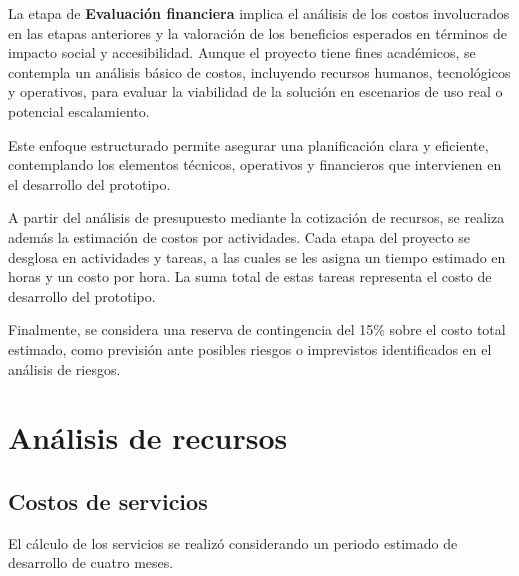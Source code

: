 La etapa de \textbf{Evaluación financiera} implica el análisis de los costos involucrados en las etapas anteriores y la valoración de los beneficios esperados en términos de impacto social y accesibilidad. Aunque el proyecto tiene fines académicos, se contempla un análisis básico de costos, incluyendo recursos humanos, tecnológicos y operativos, para evaluar la viabilidad de la solución en escenarios de uso real o potencial escalamiento.

Este enfoque estructurado permite asegurar una planificación clara y eficiente, contemplando los elementos técnicos, operativos y financieros que intervienen en el desarrollo del prototipo.

A partir del análisis de presupuesto mediante la cotización de recursos, se realiza además la estimación de costos por actividades. Cada etapa del proyecto se desglosa en actividades y tareas, a las cuales se les asigna un tiempo estimado en horas y un costo por hora. La suma total de estas tareas representa el costo de desarrollo del prototipo.

Finalmente, se considera una reserva de contingencia del 15\% sobre el costo total estimado, como previsión ante posibles riesgos o imprevistos identificados en el análisis de riesgos.

\newpage

\section{Análisis de recursos}

\subsection{Costos de servicios}

El cálculo de los servicios se realizó considerando un periodo estimado de desarrollo de cuatro meses.

